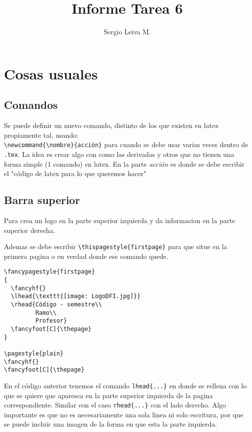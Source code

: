 \documentclass[letter,10pt]{article}
\begin{document}
\author{Sergio Leiva M.}
\title{\textbf{Informe Tarea 6}}
\maketitle

\section{Cosas usuales}

\subsection{Comandos}
Se puede definir un nuevo comando, distinto de los que existen en latex propiamente tal, usando: \\
 \verb+\newcommand{\nombre}{acción}+ para cuando se debe usar varias veces dentro de \verb+.tex+. La idea es crear algo  con como las derivadas y otros que no tienen una forma simple (1 comando) en latex. En la parte \textit{acción} es donde se debe escribir el "código de latex para lo que queremos hacer" 


\subsection{Barra superior}
Para crea un logo en la parte superior izquierda y da informacion en la parte superior derecha. 

 Ademas se debe escribir \verb+\thispagestyle{firstpage}+ para que situe en la primera pagina o en verdad donde ese comando quede.

\begin{verbatim} 
\fancypagestyle{firstpage}
{
  \fancyhf{}
  \lhead{\texttt{[image: LogoDFI.jpg]}}
  \rhead{Código - semestre\\
         Ramo\\
         Profesor}
  \fancyfoot[C]{\thepage}
}

\pagestyle{plain}
\fancyhf{}
\fancyfoot[C]{\thepage}

\end{verbatim}

En el código anterior tenemos el comando \verb+lhead{...}+ en donde se rellena con lo que se quiere que aparesca en la parte superior izquierda de la pagina correspondiente. Similar con el caso \verb+rhead{...}+ con el lado derecho. Algo importante es que no es necesariamente una sola linea ni solo escritura, por que se puede incluir una imagen de la forma en que esta la parte izquierda.
\end{document}
